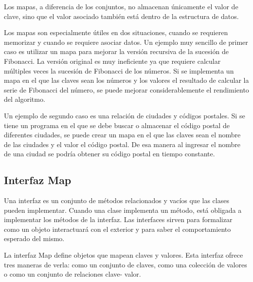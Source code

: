 \documentclass[11pt]{article}
\begin{document}
\par

Los mapas, a diferencia de los conjuntos, no almacenan únicamente el 
valor de clave, sino que el valor asociado también está dentro de la 
estructura de datos.

\par

Los mapas son especialmente útiles en dos situaciones, cuando se 
requieren memorizar y cuando se requiere asociar datos. Un ejemplo 
muy sencillo de primer caso es utilizar un mapa para mejorar la 
versión recursiva de la sucesión de Fibonacci. La versión original es 
muy ineficiente ya que requiere calcular múltiples veces la sucesión 
de Fibonacci de los números. Si se implementa un mapa en el que las 
claves sean los números y los valores el resultado de calcular la 
serie de Fibonacci del número, se puede mejorar considerablemente el 
rendimiento del algoritmo.

\par

Un ejemplo de segundo caso es una relación de ciudades y códigos 
postales. Si se tiene un programa en el que se debe buscar o 
almacenar el código postal de diferentes ciudades, se puede crear un 
mapa en el que las claves sean el nombre de las ciudades y el valor 
el código postal. De esa manera al ingresar el nombre de una ciudad 
se podría obtener su código postal en tiempo constante.

\subsection{Interfaz Map}

\par

Una interfaz es un conjunto de métodos relacionados y vacíos que las 
clases pueden implementar. Cuando una clase implementa un método, 
está obligada a implementar los métodos de la interfaz. Las 
interfaces sirven para formalizar como un objeto interactuará con el 
exterior y para saber el comportamiento esperado del mismo.

\par

La interfaz Map define objetos que mapean claves y valores. Esta 
interfaz ofrece tres maneras de verla: como un conjunto de claves, 
como una colección de valores o como un conjunto de relaciones clave-
valor.

\par
\end{document}
